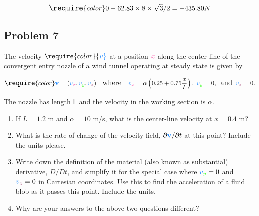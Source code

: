 \documentclass[
  1.2em,
  letterpaper,
  DIV=11,
  numbers=noendperiod]{scrartcl}
\begin{document}
\[
\large
\require{color}
0 - 62.83 \times 8 \times \sqrt{3}/2  = -435.80N
\]

\hypertarget{problem-7}{%
\subsection{Problem 7}\label{problem-7}}

The velocity
\(\require{color}{\color[rgb]{0.059472,0.501943,0.998465}v}\) at a
position \({\color[rgb]{0.986048,0.008333,0.501924}x}\) along the
center-line of the convergent entry nozzle of a wind tunnel operating at
steady state is given by

\[
\large
\require{color}
\mathbf{{\color[rgb]{0.059472,0.501943,0.998465}v}}  = \left({\color[rgb]{0.059472,0.501943,0.998465}v}_{{\color[rgb]{0.986048,0.008333,0.501924}x}}, {\color[rgb]{0.059472,0.501943,0.998465}v}_{{\color[rgb]{0.131302,0.999697,0.023594}y}}, {\color[rgb]{0.059472,0.501943,0.998465}v}_{{\color[rgb]{0.501963,0.000037,0.250983}z}} \right) \; \; \; 
\textrm{where} \; \;  \; \; {\color[rgb]{0.059472,0.501943,0.998465}v}_{{\color[rgb]{0.986048,0.008333,0.501924}x}} = \alpha\left(0.25 + 0.75 \frac{x}{L} \right), \; {\color[rgb]{0.059472,0.501943,0.998465}v}_{{\color[rgb]{0.131302,0.999697,0.023594}y}}= 0, \; \; \textrm{and} \; \; {\color[rgb]{0.059472,0.501943,0.998465}v}_{{\color[rgb]{0.501963,0.000037,0.250983}z}}=0.
\]

The nozzle has length \(\mathsf{L}\) and the velocity in the working
section is \(\alpha\).

\begin{enumerate}
\def\labelenumi{\arabic{enumi}.}
\item
  If \(L = 1.2\) m and \(\alpha=10\) m/s, what is the center-line
  velocity at \(x=0.4\) m?
\item
  What is the rate of change of the velocity field,
  \(\partial \mathbf{{\color[rgb]{0.059472,0.501943,0.998465}v}}/\partial t\)
  at this point? Include the units please.
\item
  Write down the definition of the material (also known as substantial)
  derivative, \(D / Dt\), and simplify it for the special case where
  \({\color[rgb]{0.059472,0.501943,0.998465}v}_{{\color[rgb]{0.131302,0.999697,0.023594}y}}= 0\)
  and
  \({\color[rgb]{0.059472,0.501943,0.998465}v}_{{\color[rgb]{0.501963,0.000037,0.250983}z}}= 0\)
  in Cartesian coordinates. Use this to find the acceleration of a fluid
  blob as it passes this point. Include the units.
\item
  Why are your answers to the above two questions different?
\end{enumerate}
\end{document}
